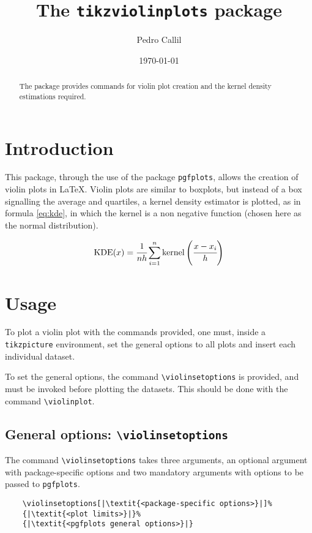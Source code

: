 \documentclass{article}
\title{The \texttt{tikzviolinplots} package}
\author{Pedro Callil}
\date{\today}
\begin{document}
\maketitle

\begin{abstract}
	The package provides commands for violin plot creation and
	the kernel density estimations required.
\end{abstract}

\section{Introduction}

This package, through the use of the package \texttt{pgfplots}, allows the
creation of violin plots in \LaTeX. Violin plots are similar to boxplots,
but instead of a box signalling the average and quartiles, a kernel density
estimator is plotted, as in formula \ref{eq:kde}, in which the kernel is a
non negative function (chosen here as the normal distribution).

\begin{equation}
	\label{eq:kde}
	\textnormal{KDE}(x) = %
	\cfrac{1}{nh}\sum_{i=1}^n\textnormal{kernel}\left(\cfrac{x-x_i}{h}\right)
\end{equation}

\section{Usage}

To plot a violin plot with the commands provided, one must, inside
a \texttt{tikzpicture} environment, set the general options to all
plots and insert each individual dataset.

To set the general options, the command \texttt{{\textbackslash}violinsetoptions}
is provided, and must be invoked before plotting the datasets. This should
be done with the command \texttt{{\textbackslash}violinplot}.

\subsection{General options: \texttt{{\textbackslash}violinsetoptions}}

The command \texttt{{\textbackslash}violinsetoptions} takes three arguments,
an optional argument with package-specific options and two mandatory
arguments with options to be passed to \texttt{pgfplots}.

\begin{verbatim}
	\violinsetoptions[|\textit{<package-specific options>}|]%
	{|\textit{<plot limits>}|}%
	{|\textit{<pgfplots general options>}|}
\end{verbatim}
\end{document}
